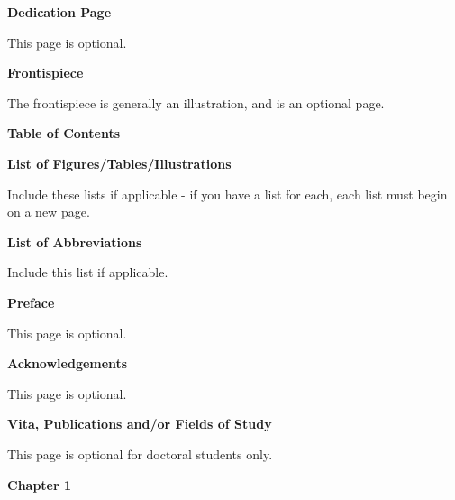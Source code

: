 \documentclass[12pt]{article}
\begin{document}
\newpage
\centerline{\bf{Dedication Page}}
\vspace*{4\baselineskip}
This page is optional.

\newpage
\centerline{\bf{Frontispiece}}
\vspace*{4\baselineskip}
The frontispiece is generally an illustration, and is an optional page.

\newpage
\centerline{\bf{Table of Contents}}

\newpage
\centerline{\bf{List of Figures/Tables/Illustrations}}
\vspace*{4\baselineskip}
Include these lists if applicable - if you have a list for each, each list must begin on a new page.

\newpage
\centerline{\bf{List of Abbreviations}}
\vspace*{4\baselineskip}
Include this list if applicable.

\newpage
\centerline{\bf{Preface}}
\vspace*{4\baselineskip}
This page is optional.

\newpage
\centerline{\bf{Acknowledgements}}
\vspace*{4\baselineskip}
This page is optional.

\newpage
\centerline{\bf{Vita, Publications and/or Fields of Study}}
\vspace*{4\baselineskip}
This page is optional for doctoral students only.

\newpage
{}


\centerline{\bf{Chapter 1}}
\end{document}
